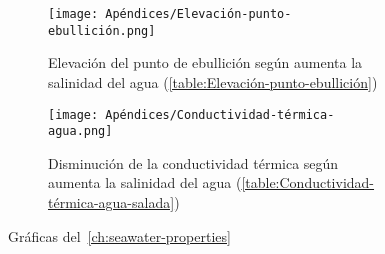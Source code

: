 \begin{figure}[H]
	\centering
	\begin{subfigure}{0.45\linewidth}
		\centering
		\texttt{[image: Apéndices/Elevación-punto-ebullición.png]}
		\caption{Elevación del punto de ebullición según aumenta la salinidad del agua (\cref{table:Elevación-punto-ebullición})}
		\label{fig:Elevación-punto-ebullición}
	\end{subfigure}
	\hfill
	\begin{subfigure}{0.45\linewidth}
		\centering
		\texttt{[image: Apéndices/Conductividad-térmica-agua.png]}
		\caption{Disminución de la conductividad térmica según aumenta la salinidad del agua (\cref{table:Conductividad-térmica-agua-salada})}
		\label{fig:Conductividad-térmica-agua}
	\end{subfigure}
	\caption{Gráficas del~\cref{ch:seawater-properties}}
	\label{fig:graficas-propiedades-agua-salinidad}
\end{figure}	